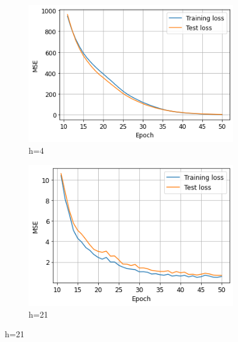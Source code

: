 \documentclass{homework}
\begin{document}
\begin{figure}
\begin{subfigure}{0.45\textwidth}
\includegraphics[width=\linewidth]{h4_loss.png}
\caption{h=4}
\end{subfigure}
\hfill %
\begin{subfigure}{0.45\textwidth}
\includegraphics[width=\linewidth]{h21_loss.png}
\caption{h=21}
\end{subfigure}


\end{figure}
\end{document}
